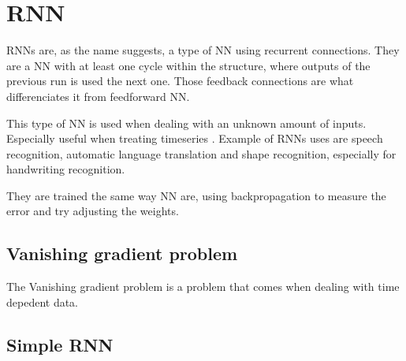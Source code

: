 \section{\acs{RNN}}\label{sec:rnn}

\acp{RNN} are, as the name suggests, a type of \ac{NN} using recurrent connections. They are a \ac{NN} with at least one cycle within the structure, where outputs of the previous run is used the next one. Those feedback connections are what differenciates it from feedforward \ac{NN}.

This type of \ac{NN} is used when dealing with an unknown amount of inputs. Especially useful when treating timeseries \cite{rnn}. Example of \acp{RNN} uses are speech recognition, automatic language translation \cite{gru} and shape recognition, especially for handwriting recognition.

They are trained the same way \ac{NN} are, using backpropagation to measure the error and try adjusting the weights.

\subsection{Vanishing gradient problem}

The Vanishing gradient problem is a problem that comes when dealing with time depedent data.


\subsection{Simple \ac{RNN}}
